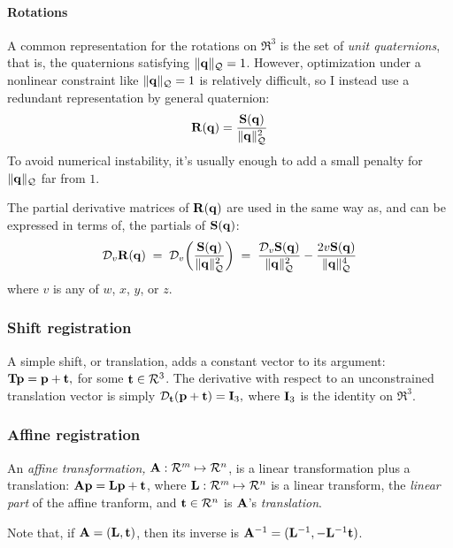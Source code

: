 \paragraph{Rotations}
\label{sec:Rotations}

A common representation for the rotations on $\Re^3$
is the set of {\it unit quaternions},
that is, the quaternions satisfying $\| {\mathbf q} \|_{\mathcal{Q}} = 1$.
However, optimization under a nonlinear constraint
like $\| {\mathbf q} \|_{\mathcal{Q}} = 1$ is relatively difficult,
so I instead use a redundant representation by general quaternion:
\begin{equation}
{\mathbf R}({\mathbf q}) = {{{\mathbf S}({\mathbf q})} \over {\| {\mathbf q}\|_{\mathcal{Q}}^2}}
\end{equation}
To avoid numerical instability, it's usually enough
to add a small penalty for $\| {\mathbf q} \|_{\mathcal{Q}}$ far from $1$.

The partial derivative matrices of ${\mathbf R}({\mathbf q})$ are used in the
same way as,
and can be expressed in terms of,
the partials of ${\mathbf S}({\mathbf q})$:
\begin{equation}
{\mathcal D}_{v}{{\mathbf R}({\mathbf q})}
\; = \;
{\mathcal D}_{v}{\left(
{{{\mathbf S}({\mathbf q})} \over {\| {\mathbf q}\|_{\mathcal{Q}}^2}}
\right)}
\; = \;
{{{\mathcal D}_{v}{{\mathbf S}({\mathbf q})}} \over {\| {\mathbf q}\|_{\mathcal{Q}}^2}}
-
{{2v {\mathbf S}({\mathbf q})} \over {\| {\mathbf q}\|_{\mathcal{Q}}^4}}
\end{equation}
where $v$ is any of $w$, $x$, $y$, or $z$.

\subsubsection{Shift registration}
\label{sec:Shift-registration}

A simple shift, or translation, adds a constant vector
to its argument: ${\mathbf T} {\mathbf p} = {\mathbf p} + {\mathbf t},$
for some ${\mathbf t} \in \mathcal{R}^3$.
The derivative with respect to
an unconstrained translation vector
is simply
${\mathcal D}_{{\mathbf t}}{({\mathbf p} + {\mathbf t})} = {\mathbf I}_3,$
where ${\mathbf I}_3$ is the identity on $\Re^3$.

\subsubsection{Affine registration}
\label{sec:affine-registration}

An {\it affine transformation,} ${\mathbf A} : \mathcal{R}^m \mapsto \mathcal{R}^n$,
is a linear transformation plus a translation:
${\mathbf A} {\mathbf p} = {\mathbf L} {\mathbf p} + {\mathbf t}$,
where ${\mathbf L} : \mathcal{R}^m \mapsto \mathcal{R}^n$ is a linear transform,
the {\it linear part} of the affine tranform,
and ${\mathbf t} \in \mathcal{R}^n$ is ${\mathbf A}$'s {\it translation}.

Note that, if ${\mathbf A} = ({\mathbf L},{\mathbf t})$, then its inverse is
${\mathbf A}^{-1} = ({\mathbf L}^{-1}, - {\mathbf L}^{-1}{\mathbf t})$.

